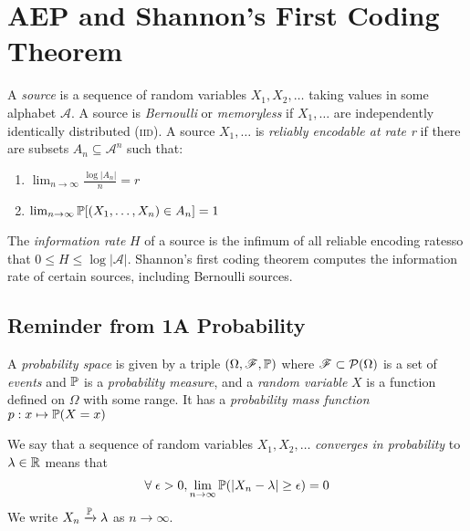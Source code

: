 \documentclass[10pt,a4paper]{article}
\begin{document}
\section{AEP and Shannon's First Coding Theorem}
A \emph{source} is a sequence of random variables $X_1, X_2, \ldots$ taking values in some alphabet $\mathscr{A}$. A source is \emph{Bernoulli} or \emph{memoryless} if $X_1, \ldots$ are independently identically distributed (\textsc{iid}). A source $X_1, \ldots$ is \emph{reliably encodable at rate r} if there are subsets $A_n \subseteq \mathscr{A}^n$ such that:
\begin{enumerate}
\item $\lim_{n\to \infty} \frac{\log|A_n|}{n} = r$
\item $\lim_{n\to \infty} \P[(X_1, \ldots, X_n)\in A_n] = 1$
\end{enumerate}
The \emph{information rate} $H$ of a source is the infimum of all reliable encoding ratesso that $0 \leq H \leq \log |\mathscr{A}|$. Shannon's first coding theorem computes the information rate of certain sources, including Bernoulli sources.

\subsection{Reminder from 1A Probability}
A \emph{probability space} is given by a triple $(\Omega, \mathscr{F}, \P)$ where $\mathscr{F} \subset \powset(\Omega)$ is a set of \emph{events} and $\P$ is a \emph{probability measure}, and a \emph{random variable} $X$ is a function defined on $\Omega$ with some range. It has a \emph{probability mass function} $p: x \mapsto \P(X=x)$

We say that a sequence of random variables $X_1, X_2, \ldots$ \emph{converges in probability} to $\lambda \in \R$ means that
\begin{align*}
\forall\;\epsilon > 0, \lim_{n \to \infty} \P(|X_n -\lambda| \geq \epsilon) = 0
\end{align*}
We write $X_n \xrightarrow{\P} \lambda$ as $n \to \infty$.
\end{document}
